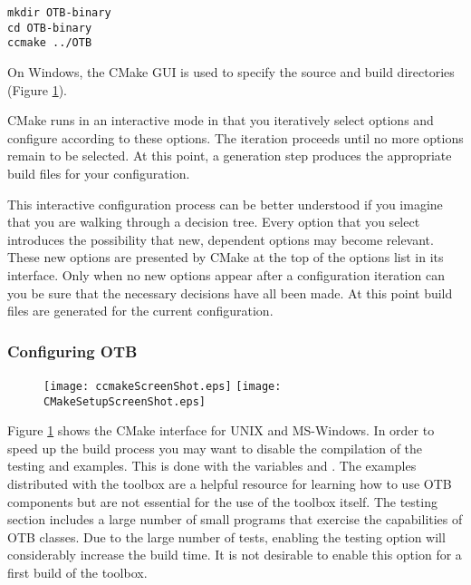 \small
\begin{verbatim}
mkdir OTB-binary
cd OTB-binary
ccmake ../OTB
\end{verbatim}
\normalsize

On Windows, the CMake GUI is used to specify the source and build
directories (Figure \ref{fig:CMakeGUI}).

CMake runs in an interactive mode in that you iteratively select
options and configure according to these options. The iteration
proceeds until no more options remain to be selected. At this point, a
generation step produces the appropriate build files for your
configuration.

This interactive configuration process can be better understood if you
imagine that you are walking through a decision tree.  Every option that you
select introduces the possibility that new, dependent options may become
relevant. These new options are presented by CMake at the top of the options
list in its interface.  Only when no new options appear after a configuration
iteration can you be sure that the necessary decisions have all been made. At
this point build files are generated for the current configuration.

\subsubsection{Configuring OTB}
\label{sec:ConfiguringOTBwithVTK}


\begin{figure}[ht]
\centering
\texttt{[image: ccmakeScreenShot.eps]}
\texttt{[image: CMakeSetupScreenShot.eps]}
\label{fig:CMakeGUI}
\end{figure}

Figure \ref{fig:CMakeGUI} shows the CMake interface for UNIX and MS-Windows.
In order to speed up the build process you may want to disable the compilation
of the testing and examples. This is done with the variables
 and .  The examples
distributed with the toolbox are a helpful resource for learning how to use OTB
components but are not essential for the use of the toolbox itself. The testing
section includes a large number of small programs that exercise the
capabilities of OTB classes. Due to the large number of tests, enabling the
testing option will considerably increase the build time.  It is not
desirable to enable this option for a first build of the toolbox.

